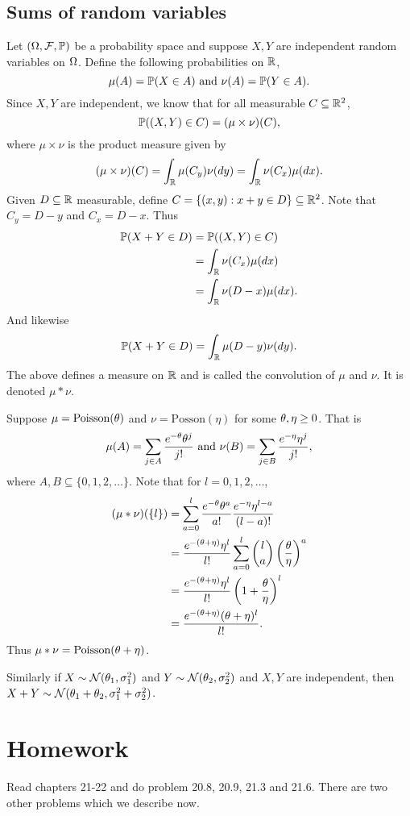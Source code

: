 \subsection{Sums of random variables}
Let $({{\Omega}},{\mathcal{F}},{\mathbb{P}})$ be a probability space and suppose $X,Y$ are independent random variables on ${{\Omega}}$. Define the following probabilities on ${\mathbb R}$,
\[\mu(A) = {\mathbb{P}}(X \in A) \text{ and } \nu(A) = {\mathbb{P}}(Y\in A). \]
Since $X,Y$ are independent, we know that for all measurable $C \subseteq {\mathbb R}^2$,
\[{\mathbb{P}}((X,Y) \in C) = (\mu \times \nu)(C), \]
where $\mu \times \nu$ is the product measure given by
\[(\mu \times \nu)(C) = \int_{\mathbb R} \mu(C_y)\nu(dy) = \int_{\mathbb R} \nu(C_x)\mu(dx). \]
Given $D \subseteq {\mathbb R}$ measurable, define $C = \{(x,y) : x+y \in D\} \subseteq {\mathbb R}^2$. Note that $C_y = D-y$ and $C_x = D-x$. Thus
\begin{align*}
    {\mathbb{P}}(X+Y \in D) &= {\mathbb{P}}((X,Y) \in C)\\
    &= \int_{\mathbb R} \nu(C_x)\mu(dx)\\
    &= \int_{\mathbb R} \nu(D-x)\mu(dx).
\end{align*}
And likewise
\[{\mathbb{P}}(X+Y \in D) = \int_{\mathbb R} \mu(D-y)\nu(dy). \]
The above defines a measure on ${\mathbb R}$ and is called the convolution of $\mu$ and $\nu$. It is denoted $\mu * \nu$.
\begin{ex}
    Suppose $\mu = \text{Poisson}({\theta})$ and $\nu = \text{Posson}(\eta)$ for some ${\theta},\eta \ge 0$. That is\
    \[\mu(A) = \sum_{j \in A}\frac{e^{-{\theta}}{\theta}^j}{j!} \text{ and } \nu(B) = \sum_{j \in B} \frac{e^{-\eta}\eta^j}{j!},\]
    where $A,B \subseteq \{0,1,2,\ldots\}$. Note that for $l = 0,1,2,\ldots$,
    \begin{align*}
        (\mu *\nu)(\{l\}) &= \sum_{a=0}^l \frac{e^{-{\theta}}{\theta}^a}{a!}\frac{e^{-\eta}\eta^{l-a}}{(l-a)!}\\
        &= \frac{e^{-({\theta}+\eta)}\eta^l}{l!} \sum_{a=0}^l \binom{l}{a} \left(\frac{{\theta}}{\eta}\right)^a\\
        &=\frac{e^{-({\theta}+\eta)}\eta^l}{l!}\left(1+\frac{{\theta}}{\eta}\right)^l\\
        &=\frac{e^{-({\theta}+\eta)}({\theta}+\eta)^l}{l!}.
    \end{align*}
    Thus $\mu *\nu = \text{Poisson}({\theta}+\eta)$.
\end{ex}
\begin{ex}
    Similarly if $X \sim {{\mathcal{N}}}({\theta}_1,\sigma^2_1)$ and $Y \sim {{\mathcal{N}}}({\theta}_2,\sigma^2_2)$ and $X,Y$ are independent, then $X+Y \sim {{\mathcal{N}}}({\theta}_1+{\theta}_2,\sigma_1^2+\sigma_2^2)$.
\end{ex}
\section{Homework}
Read chapters 21-22 and do problem 20.8, 20.9, 21.3 and 21.6. There are two other problems which we describe now.
